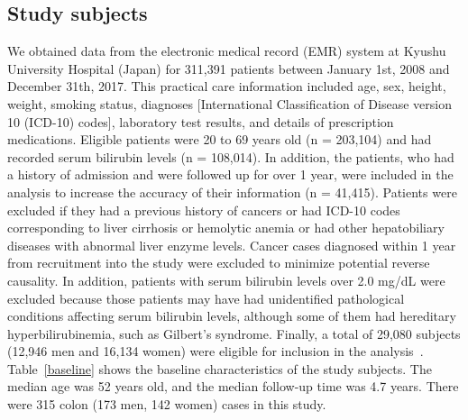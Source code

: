 \documentclass[nohyperref]{article}
\theoremstyle{plain}
\theoremstyle{definition}
\theoremstyle{remark}
\begin{document}
\subsection{Study subjects}
We obtained data from the electronic medical record (EMR) system at Kyushu University Hospital (Japan) for 311,391 patients between January 1st, 2008 and December 31th, 2017.
This practical care information included age, sex, height, weight, smoking status, diagnoses [International Classification of Disease version 10 (ICD-10) codes], laboratory test results, and details of prescription medications.
Eligible patients were 20 to 69 years old (n = 203,104) and had recorded serum bilirubin levels (n = 108,014).
In addition, the patients, who had a history of admission and were followed up for over 1 year, were included in the analysis to increase the accuracy of their information (n = 41,415).
Patients were excluded if they had a previous history of cancers or had ICD-10 codes corresponding to liver cirrhosis or hemolytic anemia or had other hepatobiliary diseases with abnormal liver enzyme levels.
Cancer cases diagnosed within 1 year from recruitment into the study were excluded to minimize potential reverse causality.
In addition, patients with serum bilirubin levels over 2.0 mg/dL were excluded because those patients may have had unidentified pathological  conditions affecting serum bilirubin levels, although some of them had hereditary hyperbilirubinemia, such as Gilbert's syndrome.
Finally, a total of 29,080 subjects (12,946 men and 16,134 women) were eligible for inclusion in the analysis~\cite{inoguchi2021association}.
Table~\ref{baseline} shows the baseline characteristics of the study subjects. The median age was 52 years old, and the median follow-up time was 4.7 years.
There were 315 colon (173 men, 142 women) cases in this study.
\end{document}
